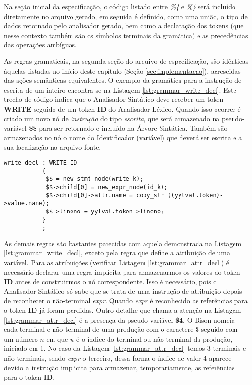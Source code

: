 Na seção inicial da especificação, o código listado entre \emph{\%\{} e
\emph{\%\}} será incluído diretamente no arquivo gerado, em seguida é
definido, como uma união, o tipo de dados retornado pelo analisador gerado,
bem como a declaração dos tokens (que nesse contexto também são os símbolos
terminais da gramática) e as precedências das operações ambíguas.

As regras gramaticais, na segunda seção do arquivo de especificação, são
idênticas àquelas listadas no início deste capítulo (Seção
\ref{sec:implementacao}), acrescidas das ações semânticas equivalentes. O
exemplo da gramática para a instrução de escrita de um inteiro encontra-se
na Listagem \ref{lst:grammar_write_decl}. Este trecho de código indica que o
Analisador Sintático deve receber um token \textbf{WRITE} seguido de um token
\textbf{ID} do Analisador Léxico. Quando isso ocorrer é criado um novo nó de
\emph{instrução} do tipo \emph{escrita}, que será armazenado na
pseudo-variável \textbf{\$\$} para ser retornado e incluído na Árvore
Sintática. Também são armazenados no nó o nome do Identificador (variável) que
deverá ser escrita e a sua localização no arquivo-fonte.

\begin{lstlisting}[label=lst:grammar_write_decl,caption=Instrução de Escrita]
write_decl : WRITE ID
           {
            $$ = new_stmt_node(write_k);
            $$->child[0] = new_expr_node(id_k);
            $$->child[0]->attr.name = copy_str ((yylval.token)->value.name);
            $$->lineno = yylval.token->lineno;
           }
           ;
\end{lstlisting}

As demais regras são bastantes parecidas com aquela demonstrada na Listagem
\ref{lst:grammar_write_decl}, exceto pela regra que define a atribuição de uma
variável. Para as atribuições (verificar Listagem \ref{lst:grammar_attr_decl})
é necessário declarar uma regra implícita para armazenarmos os valores do token
\textbf{ID} antes de construirmos o nó correspondente. Isso é necessário, pois
o Analisador Sintático só sabe que se trata de uma instrução de atribuição
depois de reconhecer o não-terminal \emph{expr}. Quando \emph{expr} é
reconhecido as referências para o token \textbf{ID} já foram perdidas. Outro
detalhe que chama a atenção na Listagem \ref{lst:grammar_attr_decl} é a
presença da pseudo-variável \textbf{\$4}. O Bison nomeia cada terminal e
não-terminal de uma produção com o caractere \$ seguido com um número $n$ em
que $n$ é o índice do terminal ou não-terminal da produção, iniciado em 1. No
caso da Listagem \ref{lst:grammar_attr_decl} temos 3 terminais e
não-terminais, sendo \emph{expr} o terceiro, dessa forma o índice de valor 4
aparece devido a instrução implícita para armazenar, temporariamente, as
referências para o token \textbf{ID}.

